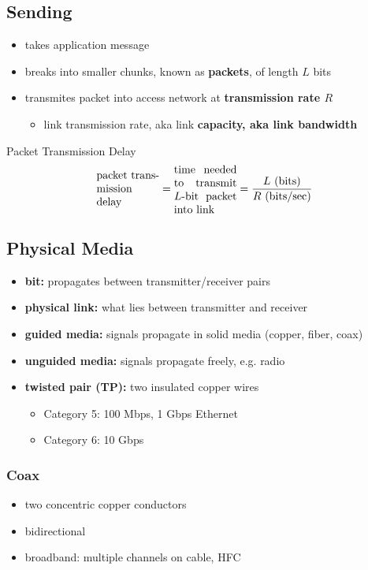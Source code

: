 \subsection{Sending}
\begin{itemize}
	\item takes application message
	\item breaks into smaller chunks, known as \textbf{packets}, of length \textbf{$L$} bits
	\item transmites packet into access network at \textbf{transmission rate $R$}
	\begin{itemize}
		\item link transmission rate, aka link \textbf{capacity, aka link bandwidth}
	\end{itemize}
\end{itemize}
\begin{note}{Packet Transmission Delay}
	\[
		\text{\parbox{2cm}{packet transmission delay}}=\text{\parbox{2cm}{time needed to transmit $L$-bit packet into link}}=\frac{L\text{ (bits)}}{R\text{ (bits/sec)}}
	\]
\end{note}

\subsection{Physical Media}
\begin{itemize}
	\item \textbf{bit:} propagates between transmitter/receiver pairs
	\item \textbf{physical link:} what lies between transmitter and receiver
	\item \textbf{guided media:} signals propagate in solid media (copper, fiber, coax)
	\item \textbf{unguided media:} signals propagate freely, e.g. radio
	\item \textbf{twisted pair (TP):} two insulated copper wires
	\begin{itemize}
		\item Category 5: 100 Mbps, 1 Gbps Ethernet
		\item Category 6: 10 Gbps
	\end{itemize}
\end{itemize}
\subsubsection{Coax}
\begin{itemize}
	\item two concentric copper conductors
	\item bidirectional
	\item broadband: multiple channels on cable, HFC
\end{itemize}
